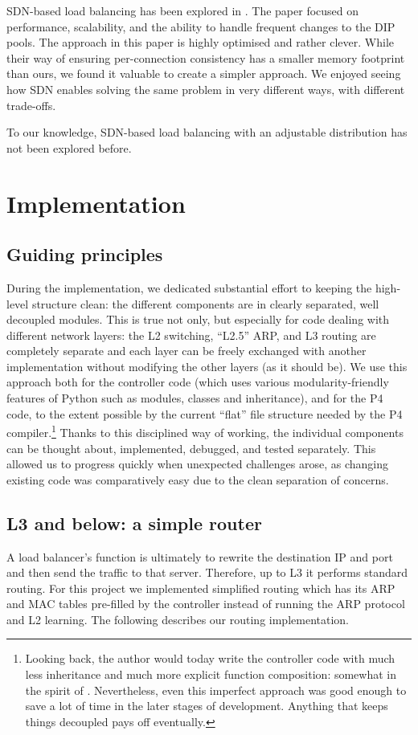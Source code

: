 \documentclass[11pt,oneside,a4paper]{article}
\begin{document}
SDN-based load balancing has been explored in \cite{silkroad}.
The paper focused on performance, scalability, and the ability to handle
frequent changes to the DIP pools.
The approach in this paper is highly optimised and rather clever.
While their way of ensuring per-connection consistency has a smaller memory
footprint than ours, we found it valuable to create a simpler approach.
We enjoyed seeing how SDN enables solving the same problem in very different
ways, with different trade-offs.

To our knowledge, SDN-based load balancing with an adjustable distribution has
not been explored before.

\section{Implementation}
\subsection{Guiding principles}
During the implementation, we dedicated substantial effort to keeping the
high-level structure clean: the different components are in clearly separated,
well decoupled modules.
This is true not only, but especially for code dealing with different network
layers: the L2 switching, ``L2.5'' ARP, and L3 routing are completely separate and
each layer can be freely exchanged with another implementation without modifying
the other layers (as it should be).
We use this approach both for the controller code (which uses various
modularity-friendly features of Python such as modules, classes and
inheritance), and for the P4 code, to the extent possible by the current
``flat'' file structure needed by the P4 compiler.\footnote{%
Looking back, the author would today write the controller code with much less
inheritance and much more explicit function composition: somewhat in the
spirit of \cite{inheritance}.
Nevertheless, even this imperfect approach was good enough to save a lot of time
in the later stages of development.
Anything that keeps things decoupled pays off eventually.%
}
Thanks to this disciplined way of working, the individual components can be
thought about, implemented, debugged, and tested separately.
This allowed us to progress quickly when unexpected challenges arose, as
changing existing code was comparatively easy due to the clean separation of
concerns.

\subsection{L3 and below: a simple router}
A load balancer's function is ultimately to rewrite the destination IP and port
and then send the traffic to that server.
Therefore, up to L3 it performs standard routing.
For this project we implemented simplified routing which has its
ARP and MAC tables pre-filled by the controller instead of running the ARP
protocol and L2 learning.
The following describes our routing implementation.
\end{document}
